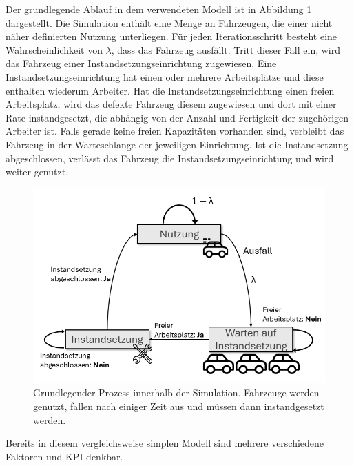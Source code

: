 \documentclass[11pt,a4paper]{article}
\begin{document}
Der grundlegende Ablauf in dem verwendeten Modell ist in Abbildung \ref{fig:Simulationsmodell} dargestellt.
Die Simulation enthält eine Menge an Fahrzeugen, die einer nicht näher definierten Nutzung unterliegen. 
Für jeden Iterationsschritt besteht eine Wahrscheinlichkeit von $\lambda$, dass das Fahrzeug ausfällt.
Tritt dieser Fall ein, wird das Fahrzeug einer Instandsetzungseinrichtung zugewiesen. 
Eine Instandsetzungseinrichtung hat einen oder mehrere Arbeitsplätze und diese enthalten wiederum Arbeiter.
Hat die Instandsetzungseinrichtung einen freien Arbeitsplatz, wird das defekte Fahrzeug diesem zugewiesen und
dort mit einer Rate instandgesetzt, die abhängig von der Anzahl und Fertigkeit der zugehörigen Arbeiter ist.
Falls gerade keine freien Kapazitäten vorhanden sind, verbleibt das Fahrzeug in der Warteschlange der jeweiligen Einrichtung.
Ist die Instandsetzung abgeschlossen, verlässt das Fahrzeug die Instandsetzungseinrichtung und wird weiter genutzt.

\begin{figure}
	\label{fig:Simulationsmodell}
	\centering
	\includegraphics[width=\textwidth]{media/Simulationsmodell.png}
	\caption{
		Grundlegender Prozess innerhalb der Simulation. Fahrzeuge werden
		genutzt, fallen nach einiger Zeit aus und müssen dann instandgesetzt
		werden.
	}
\end{figure}

Bereits in diesem vergleichsweise simplen Modell sind mehrere verschiedene Faktoren und KPI denkbar.
\end{document}
